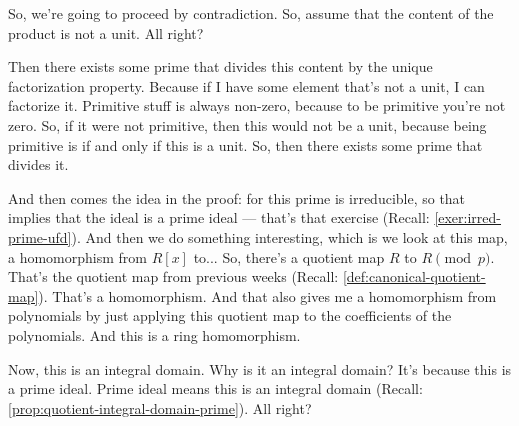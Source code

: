 \begin{content}
\end{content}

\begin{speech}[00:11:20 - 00:13:25]
So, we're going to proceed by contradiction. So, assume that the content of the product is not a unit.  All right?

Then there exists some prime that divides this content by the unique factorization property.  Because if I have some element that's not a unit, I can factorize it. Primitive stuff is always non-zero, because to be primitive you're not zero. So, if it were not primitive, then this would not be a unit, because being primitive is if and only if this is a unit. So, then there exists some prime that divides it.

And then comes the idea in the proof: for this prime is irreducible, so that implies that the ideal is a prime ideal --- that's that exercise (Recall: \cref{exer:irred-prime-ufd}).  And then we do something interesting, which is we look at this map, a homomorphism from $R[x]$ to... So, there's a quotient map $R$ to $R \pmod p$.  That's the quotient map from previous weeks (Recall: \cref{def:canonical-quotient-map}). That's a homomorphism. And that also gives me a homomorphism from polynomials by just applying this quotient map to the coefficients of the polynomials.  And this is a ring homomorphism.

Now, this is an integral domain.  Why is it an integral domain? It's because this is a prime ideal. Prime ideal means this is an integral domain (Recall: \cref{prop:quotient-integral-domain-prime}). All right?
\end{speech}


